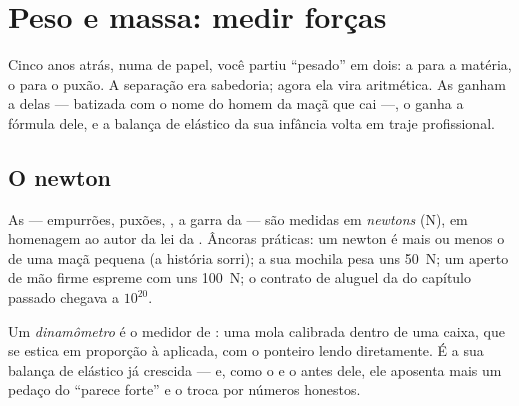 \chapter{Peso e massa: medir forças}\label{ch:g9:weight-vs-mass}

Cinco anos atrás, numa  de papel, você partiu ``pesado'' em dois:
a  para a matéria, o  para o puxão. A separação era
sabedoria; agora ela vira aritmética. As  ganham a 
delas --- batizada com o nome do homem da maçã que cai ---, o 
ganha a fórmula dele, e a balança de elástico da sua infância volta em
traje profissional.

\section{O newton}

\begin{definition}[O newton]\label{def:g9:weight-vs-mass:newton}
As  --- empurrões, puxões, , a garra da  --- são
medidas em \emph{newtons} (\unit{N}), em homenagem ao
autor da lei da . Âncoras práticas: um newton é mais ou
menos o  de uma maçã pequena (a história sorri); a sua mochila
pesa uns \qty{50}{N}; um aperto de mão firme espreme com uns
\qty{100}{N}; o contrato de aluguel da  do capítulo passado
chegava a $10^{20}$.
\end{definition}

\begin{definition}[Dinamômetro]\label{def:g9:weight-vs-mass:dynamometer}
Um \emph{dinamômetro} é o medidor de : uma
mola calibrada dentro de uma caixa, que se estica em proporção à
 aplicada, com o ponteiro lendo  diretamente. É a sua
balança de elástico já crescida --- e, como o  e o
 antes dele, ele aposenta mais um pedaço do ``parece
forte'' e o troca por números honestos.
\end{definition}

